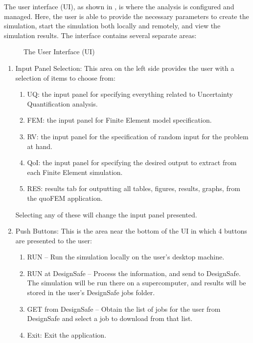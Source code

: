 The user interface (UI), as shown in , is where the analysis
is configured and managed. Here, the user is able to provide the necessary
parameters to create the simulation, start the simulation both locally and
remotely, and view the simulation results. The interface contains several
separate areas:

\begin{figure}[!htbp]
  \caption{The User Interface (UI)}
  \label{fig:generic_ui}
\end{figure}

\begin{enumerate}
\item Input Panel Selection: This area on the left side provides the
  user with a selection of items to choose from:
\begin{enumerate}
  \item UQ: the input panel for specifying everything related to Uncertainty Quantification analysis.
  \item FEM: the input panel for Finite Element model specification.
  \item RV: the input panel for the specification of random input for the problem at hand.
  \item QoI: the input panel for specifying the desired output to extract from each Finite Element simulation.
  \item RES: results tab for outputting all tables, figures, results, graphs, from the quoFEM application.  
\end{enumerate}

Selecting any of these will change the input panel presented.

\item Push Buttons: This is the area near the bottom of the UI in
  which 4 buttons are presented to the user:

\begin{enumerate}
\item RUN – Run the simulation locally on the user’s desktop machine.
\item RUN at DesignSafe – Process the information, and send to
  DesignSafe. The simulation will be run there on a supercomputer, and results
  will be stored in the user's DesignSafe jobs folder.
\item GET from DesignSafe – Obtain the list of
  jobs for the user from DesignSafe and select a job to download from that list.
\item Exit: Exit the application.
\end{enumerate}


\end{enumerate}
